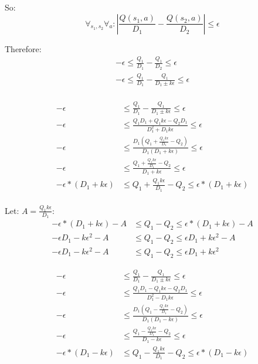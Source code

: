 \documentclass[11pt]{amsart}
\begin{document}
So:
\begin{equation}
\forall_{s_1,s_2} \forall_a : | \frac{Q(s_1,a)}{D_1} - \frac{Q(s_2,a)}{D_2} | \leq \epsilon
\end{equation}

Therefore:
\begin{align*}
-\epsilon \leq \frac{Q_1}{D_1} - \frac{Q_1}{D_2} \leq \epsilon \\
-\epsilon \leq \frac{Q_1}{D_1} - \frac{Q_1}{D_1 \pm k\epsilon} \leq \epsilon \\
\end{align*}

\encircle{+}
\begin{align*}
-\epsilon &\leq \frac{Q_1}{D_1} - \frac{Q_1}{D_1 \pm k\epsilon} \leq \epsilon \\
-\epsilon &\leq \frac{Q_1 D_1 + Q_1 k \epsilon - Q_2 D_1}{D_1^2 + D_1 k \epsilon} \leq \epsilon \\
-\epsilon &\leq \frac{D_1 (Q_1 + \frac{Q_1 k \epsilon}{D_1} - Q_2)}{D_1 (D_1 + k \epsilon)} \leq \epsilon \\
-\epsilon &\leq \frac{Q_1 + \frac{Q_1 k \epsilon}{D_1} - Q_2}{D_1 + k \epsilon} \leq \epsilon \\
-\epsilon*(D_1 + k \epsilon) &\leq Q_1 + \frac{Q_1 k \epsilon}{D_1} - Q_2 \leq \epsilon*(D_1 + k \epsilon) \\
\end{align*}

Let: $A = \frac{Q_1 k \epsilon}{D_1}$:
\begin{align*}
-\epsilon*(D_1 + k \epsilon) - A &\leq Q_1 - Q_2 \leq \epsilon*(D_1 + k \epsilon) - A \\
-\epsilon D_1 - k \epsilon^2 - A &\leq Q_1 - Q_2 \leq \epsilon D_1 + k \epsilon^2 - A \\
-\epsilon D_1 - k \epsilon^2 - A &\leq Q_1 - Q_2 \leq \epsilon D_1 + k \epsilon^2
\end{align*}


\encircle{-}
\begin{align*}
-\epsilon &\leq \frac{Q_1}{D_1} - \frac{Q_1}{D_1 \pm k\epsilon} \leq \epsilon \\
-\epsilon &\leq \frac{Q_1 D_1 - Q_1 k \epsilon - Q_2 D_1}{D_1^2 - D_1 k \epsilon} \leq \epsilon \\
-\epsilon &\leq \frac{D_1 (Q_1 - \frac{Q_1 k \epsilon}{D_1} - Q_2)}{D_1 (D_1 - k \epsilon)} \leq \epsilon \\
-\epsilon &\leq \frac{Q_1 - \frac{Q_1 k \epsilon}{D_1} - Q_2}{D_1 - k \epsilon} \leq \epsilon \\
-\epsilon*(D_1 - k \epsilon) &\leq Q_1 - \frac{Q_1 k \epsilon}{D_1} - Q_2 \leq \epsilon*(D_1 - k \epsilon) \\
\end{align*}
\end{document}
